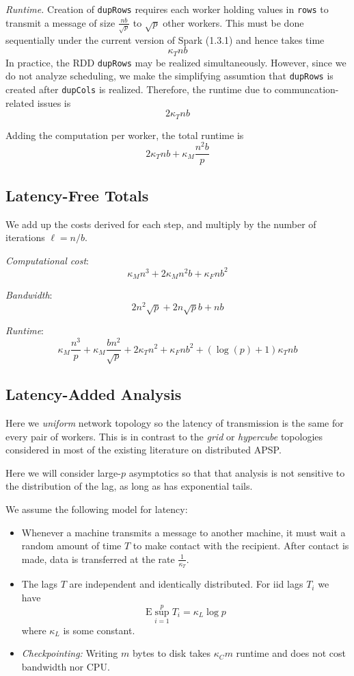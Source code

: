 \documentclass{article} %
\begin{document}
\emph{Runtime.}  Creation of {\tt dupRows} requires each worker
holding values in {\tt rows} to transmit a message of size
$\frac{nb}{\sqrt{p}}$ to $\sqrt{p}$ other workers.  This must be done
sequentially under the current version of Spark (1.3.1) and hence
takes time
\[
\kappa_T nb
\]
In practice, the RDD {\tt dupRows} may be realized simultaneously.
However, since we do not analyze scheduling, we make the simplifying
assumtion that {\tt dupRows} is created after {\tt dupCols} is
realized.
Therefore, the runtime due to communcation-related issues is
\[
2\kappa_T nb
\]

Adding the computation per worker, the total runtime is
\[
2\kappa_T nb + \kappa_M \frac{n^2b}{p}
\]

\subsection{Latency-Free Totals}

We add up the costs derived for each step, and multiply by the number of iterations $\ell = n/b$.

\emph{Computational cost}:
\[
\kappa_M n^3 + 2\kappa_M n^2 b + \kappa_F n b^2
\]

\emph{Bandwidth}:
\[
2n^2 \sqrt{p} + 2n \sqrt{p} b + nb
\]

\emph{Runtime}:
\[
\kappa_M \frac{n^3}{p} + \kappa_M \frac{bn^2}{\sqrt{p}} + 2\kappa_T n^2 + \kappa_F nb^2 + (\log(p) + 1)\kappa_T nb
\]

\subsection{Latency-Added Analysis}

Here we \emph{uniform} network topology so the latency of transmission
is the same for every pair of workers.  This is in contrast to the
\emph{grid} or \emph{hypercube} topologies considered in most of the
existing literature on distributed APSP.

Here we will consider large-$p$ asymptotics so that that analysis is
not sensitive to the distribution of the lag, as long as has
exponential tails.

We assume the following model for latency:
\begin{itemize}
\item Whenever a machine transmits a message to another machine, it
  must wait a random amount of time $T$ to make contact with the
  recipient.  After contact is made, data is transferred at the rate
  $\frac{1}{\kappa_T}$.
\item The lags $T$ are independent and identically distributed.
For iid lags $T_i$ we have
\[
\text{E} \sup_{i=1}^p T_i = \kappa_L \log p
\]
where $\kappa_L$ is some constant.
\item \emph{Checkpointing:} Writing $m$ bytes to disk takes $\kappa_C
  m$ runtime and does not cost bandwidth nor CPU.
\end{itemize}
\end{document}
